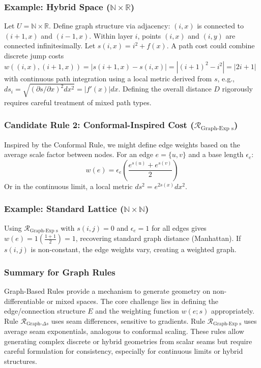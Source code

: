 \documentclass[twoside,twocolumn]{article}
\numberwithin{equation}{section} %
\begin{document}
\subsubsection{Example: Hybrid Space ($\mathbb{N} \times \mathbb{R}$)}
Let $U = \mathbb{N} \times \mathbb{R}$. Define graph structure via adjacency: $(i, x)$ is connected to $(i+1, x)$ and $(i-1, x)$. Within layer $i$, points $(i, x)$ and $(i, y)$ are connected infinitesimally. Let $s(i, x) = i^2 + f(x)$. A path cost could combine discrete jump costs $w((i,x), (i+1,x)) = |s(i+1,x)-s(i,x)| = |(i+1)^2-i^2| = |2i+1|$ with continuous path integration using a local metric derived from $s$, e.g., $ds_{i} = \sqrt{(\partial s / \partial x)^2 dx^2} = |f'(x)|dx$. Defining the overall distance $D$ rigorously requires careful treatment of mixed path types.

\subsubsection{Candidate Rule 2: Conformal-Inspired Cost ($\mathcal{R}_{\text{Graph-Exp s}}$)}
Inspired by the Conformal Rule, we might define edge weights based on the average scale factor between nodes. For an edge $e=\{u, v\}$ and a base length $\epsilon_e$:
$$ w(e) = \epsilon_e \left( \frac{e^{s(u)} + e^{s(v)}}{2} \right) $$
Or in the continuous limit, a local metric $ds^2 = e^{2s(x)} dx^2$.

\subsubsection{Example: Standard Lattice ($\mathbb{N} \times \mathbb{N}$)}
Using $\mathcal{R}_{\text{Graph-Exp s}}$ with $s(i, j)=0$ and $\epsilon_e=1$ for all edges gives $w(e) = 1 (\frac{1+1}{2}) = 1$, recovering standard graph distance (Manhattan). If $s(i,j)$ is non-constant, the edge weights vary, creating a weighted graph.

\subsubsection{Summary for Graph Rules}
Graph-Based Rules provide a mechanism to generate geometry on non-differentiable or mixed spaces. The core challenge lies in defining the edge/connection structure $E$ and the weighting function $w(e; s)$ appropriately. Rule $\mathcal{R}_{\text{Graph-}\Delta s}$ uses seam differences, sensitive to gradients. Rule $\mathcal{R}_{\text{Graph-Exp s}}$ uses average seam exponentials, analogous to conformal scaling. These rules allow generating complex discrete or hybrid geometries from scalar seams but require careful formulation for consistency, especially for continuous limits or hybrid structures.
\end{document}
